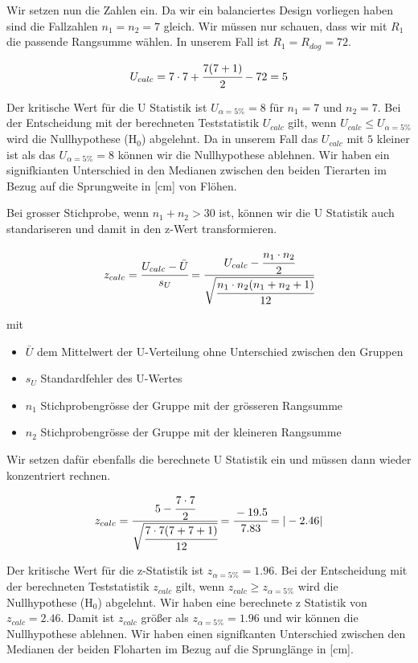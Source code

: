 \documentclass[
  letterpaper,
]{scrbook}
\providecommand{\tightlist}{%
  \setlength{\itemsep}{0pt}\setlength{\parskip}{0pt}}\usepackage{longtable,booktabs,array}
\begin{document}
Wir setzen nun die Zahlen ein. Da wir ein balanciertes Design vorliegen
haben sind die Fallzahlen \(n_1 = n_2 = 7\) gleich. Wir müssen nur
schauen, dass wir mit \(R_1\) die passende Rangsumme wählen. In unserem
Fall ist \(R_1 = R_{dog} = 72\).

\[
U_{calc} = 7 \cdot 7 + \cfrac{7(7+1)}{2}-72 = 5
\]

Der kritische Wert für die U Statistik ist \(U_{\alpha = 5\%} = 8\) für
\(n_1 = 7\) und \(n_2 = 7\). Bei der Entscheidung mit der berechneten
Teststatistik \(U_{calc}\) gilt, wenn \(U_{calc} \leq U_{\alpha = 5\%}\)
wird die Nullhypothese (H\(_0\)) abgelehnt. Da in unserem Fall das
\(U_{calc}\) mit \(5\) kleiner ist als das \(U_{\alpha = 5\%} = 8\)
können wir die Nullhypothese ablehnen. Wir haben ein signifkianten
Unterschied in den Medianen zwischen den beiden Tierarten im Bezug auf
die Sprungweite in {[}cm{]} von Flöhen.

Bei grosser Stichprobe, wenn \(n_1 + n_2 > 30\) ist, können wir die U
Statistik auch standariseren und damit in den z-Wert transformieren.

\[
z_{calc} = \cfrac{U_{calc} - \bar{U}}{s_U} = \cfrac{U_{calc} - \cfrac{n_1 \cdot n_2}{2}}{\sqrt{\cfrac{n_1 \cdot n_2 (n_1 + n_2 +1)}{12}}}
\]

mit

\begin{itemize}
\tightlist
\item
  \(\bar{U}\) dem Mittelwert der U-Verteilung ohne Unterschied zwischen
  den Gruppen
\item
  \(s_U\) Standardfehler des U-Wertes
\item
  \(n_1\) Stichprobengrösse der Gruppe mit der grösseren Rangsumme
\item
  \(n_2\) Stichprobengrösse der Gruppe mit der kleineren Rangsumme
\end{itemize}

Wir setzen dafür ebenfalls die berechnete U Statistik ein und müssen
dann wieder konzentriert rechnen.

\[
z_{calc} = \cfrac{5 - \cfrac{7 \cdot 7}{2}}{\sqrt{\cfrac{7 \cdot 7 (7 + 7 +1)}{12}}} = \cfrac{-19.5}{7.83} = |-2.46|
\]

Der kritische Wert für die z-Statistik ist \(z_{\alpha = 5\%} = 1.96\).
Bei der Entscheidung mit der berechneten Teststatistik \(z_{calc}\)
gilt, wenn \(z_{calc} \geq z_{\alpha = 5\%}\) wird die Nullhypothese
(H\(_0\)) abgelehnt. Wir haben eine berechnete z Statistik von
\(z_{calc} = 2.46\). Damit ist \(z_{calc}\) größer als
\(z_{\alpha = 5\%} = 1.96\) und wir können die Nullhypothese ablehnen.
Wir haben einen signifkanten Unterschied zwischen den Medianen der
beiden Floharten im Bezug auf die Sprunglänge in {[}cm{]}.
\end{document}
